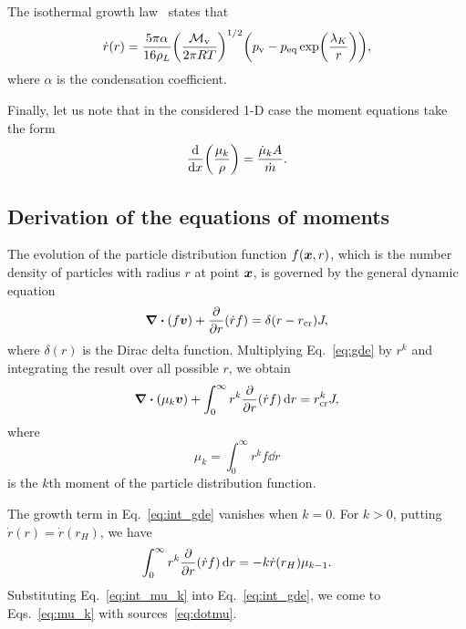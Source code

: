 \documentclass{article}
\newcommand{\vap}{\text{v}}
\newcommand{\eq}{\text{eq}}
\newcommand{\crit}[2][]{#2_\text{cr#1}}
\newcommand{\bv}{\vb*{v}}
\newcommand{\bx}{\vb*{x}}
\begin{document}
The isothermal growth law~\cite{sinha2009modeling} states that
\begin{equation}\label{eq:dotr}
    \dot{r}(r) = \frac{5\pi\alpha}{16\rho_L}
        \qty(\frac{\mathcal{M}_\vap}{2\pi RT})^{1/2} \qty(p_\vap-p_\eq\exp(\frac{\lambda_K}{r})),
\end{equation}
where $\alpha$ is the condensation coefficient.

Finally, let us note that in the considered 1-D case the moment equations take the form
\begin{equation}\label{eq:moments}
    \dv{x}(\frac{\mu_k}{\rho}) = \frac{\dot{\mu}_kA}{\dot{m}}.
\end{equation}

\subsection{Derivation of the equations of moments}

The evolution of the particle distribution function $f(\bx,r)$,
which is the number density of particles with radius $r$ at point $\bx$,
is governed by the general dynamic equation~\cite{seinfeld2006atmospheric, hagmeijer2005solution}
\begin{equation}\label{eq:gde}
    \div(f\bv) + \pdv{r}\qty(\dot{r}f) = \delta(r-\crit{r})J,
\end{equation}
where $\delta(r)$ is the Dirac delta function.
Multiplying Eq.~\eqref{eq:gde} by $r^k$ and integrating the result over all possible $r$,
we obtain
\begin{equation}\label{eq:int_gde}
    \div(\mu_k\bv) + \int_0^\infty r^k\pdv{r}\qty(\dot{r}f)\dd{r} = \crit{r}^k J,
\end{equation}
where
\begin{equation}\label{eq:int_mu_k}
    \mu_k = \int_0^\infty r^k f \dd{r}
\end{equation}
is the $k$th moment of the particle distribution function.

The growth term in Eq.~\eqref{eq:int_gde} vanishes when $k=0$.
For $k>0$, putting $\dot{r}(r) = \dot{r}(r_H)$, we have
\begin{equation}\label{eq:Hill}
    \int_0^\infty r^k\pdv{r}\qty(\dot{r}f)\dd{r} = -k\dot{r}(r_H)\mu_{k-1}.
\end{equation}
Substituting Eq.~\eqref{eq:int_mu_k} into Eq.~\eqref{eq:int_gde},
we come to Eqs.~\eqref{eq:mu_k} with sources~\eqref{eq:dotmu}.
\end{document}
